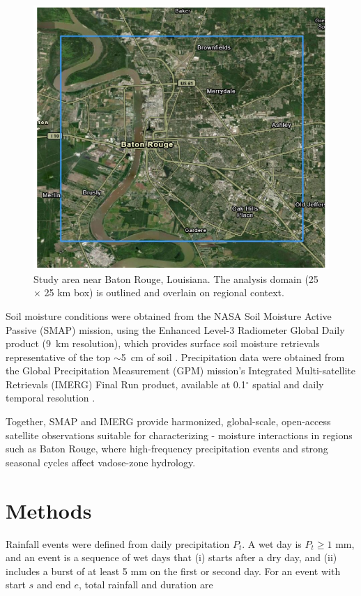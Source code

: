 \documentclass[twocolumn]{article}
\begin{document}
\begin{figure}[!h]
  \centering
  \includegraphics[width=0.95\columnwidth]{map}
  \caption{Study area near Baton Rouge, Louisiana. The analysis domain (25 $\times$ 25 km box) is outlined and overlain on regional context.}
  \label{fig:map}
\end{figure}

Soil moisture conditions were obtained from the NASA Soil Moisture Active Passive (SMAP) mission, using the Enhanced Level-3 Radiometer Global Daily product (9~km resolution), which provides surface soil moisture retrievals representative of the top $\sim$5~cm of soil \cite{smap}. Precipitation data were obtained from the Global Precipitation Measurement (GPM) mission's Integrated Multi-satellite Retrievals (IMERG) Final Run product, available at 0.1$^{\circ}$ spatial and daily temporal resolution \cite{imergdp}.

Together, SMAP and IMERG provide harmonized, global-scale, open-access satellite observations suitable for characterizing - moisture interactions in regions such as Baton Rouge, where high-frequency precipitation events and strong seasonal cycles affect vadose-zone hydrology.

\section*{Methods}

Rainfall events were defined from daily precipitation \(P_t\). A wet day is \(P_t \geq 1\) mm, and an event is a sequence of wet days that (i) starts after a dry day, and (ii) includes a burst of at least 5 mm on the first or second day. For an event with start \(s\) and end \(e\), total rainfall and duration are  
\end{document}
